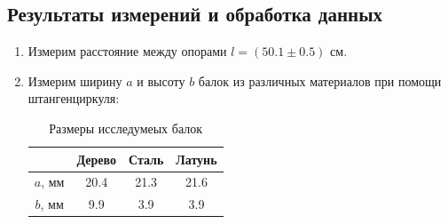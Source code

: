 \documentclass[12pt]{article}
\begin{document}
    \subsection{Результаты измерений и обработка данных}
    \begin{enumerate}
        \item Измерим расстояние между опорами $l = (50.1 \pm 0.5)$ см.
        \item Измерим ширину $a$ и высоту $b$ балок из различных
        материалов при помощи штангенциркуля:
        \begin{table}[H]
            \centering
            \caption{Размеры исследумеых балок}
            \begin{tabular}{|c|c|c|c|}
            \hline
                    & Дерево & Сталь & Латунь \\ \hline
            $a$, мм & 20.4   & 21.3  & 21.6   \\ \hline
            $b$, мм & 9.9    & 3.9   & 3.9    \\ \hline
            \end{tabular}
        \end{table}


\end{enumerate}
\end{document}
